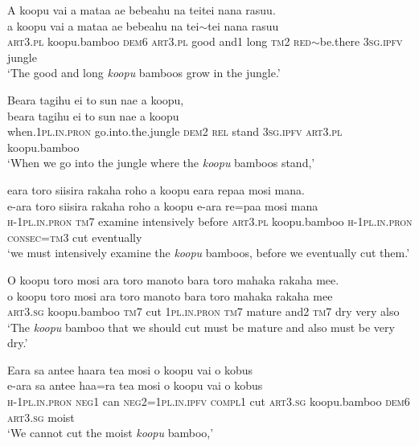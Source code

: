 \ea\label{ex:text14-6}
A koopu vai a mataa ae bebeahu na teitei nana rasuu.\\
\gll a	koopu	vai	a	mataa	ae	bebeahu	na	tei{$\sim$}tei	nana	rasuu\\
     \textsc{art}3.\textsc{pl}	koopu.bamboo	\textsc{dem}6	\textsc{art}3.\textsc{pl}	good	and1	long	\textsc{tm}2	\textsc{red}{$\sim$}be.there	3\textsc{sg}.\textsc{ipfv}	jungle\\
\glt `The good and long \textit{koopu} bamboos grow in the jungle.'
\z

\ea\label{ex:text14-7}
Beara tagihu ei to sun nae a koopu,\\
\gll beara	tagihu	ei	to	sun	nae	a	koopu\\
     when.1\textsc{pl}.\textsc{in}.\textsc{pron}	go.into.the.jungle	\textsc{dem}2	\textsc{rel}	stand	3\textsc{sg}.\textsc{ipfv}	\textsc{art}3.\textsc{pl}	koopu.bamboo\\
\glt `When we go into the jungle where the \textit{koopu} bamboos stand,'
\z

\ea\label{ex:text14-8}
eara toro siisira rakaha roho a koopu eara repaa mosi mana.\\
\gll e-ara	toro	siisira	rakaha	roho	a	koopu	e-ara	re=paa	mosi	mana\\
     \textsc{h}-1\textsc{pl}.\textsc{in}.\textsc{pron}	\textsc{tm}7	examine	intensively	before	\textsc{art}3.\textsc{pl}	koopu.bamboo	\textsc{h}-1\textsc{pl}.\textsc{in}.\textsc{pron}	\textsc{consec}=\textsc{tm}3	cut	eventually\\
\glt `we must intensively examine the \textit{koopu} bamboos, before we eventually cut them.'
\z

\ea\label{ex:text14-9}
O koopu toro mosi ara toro manoto bara toro mahaka rakaha mee.\\
\gll o	koopu	toro	mosi	ara	toro	manoto	bara	toro	mahaka	rakaha	mee\\
     \textsc{art}3.\textsc{sg}	koopu.bamboo	\textsc{tm}7	cut	1\textsc{pl}.\textsc{in}.\textsc{pron}	\textsc{tm}7	mature	and2	\textsc{tm}7	dry	very	also\\
\glt `The \textit{koopu} bamboo that we should cut must be mature and also must be very dry.'
\z

\ea\label{ex:text14-10}
Eara sa antee haara tea mosi o koopu vai o kobus\\
\gll e-ara	sa	antee	haa=ra	tea	mosi	o	koopu	vai	o	kobus\\
     \textsc{h}-1\textsc{pl}.\textsc{in}.\textsc{pron}	\textsc{neg}1	can	\textsc{neg}2=1\textsc{pl}.\textsc{in}.\textsc{ipfv}	\textsc{compl}1	cut	\textsc{art}3.\textsc{sg}	koopu.bamboo	\textsc{dem}6	\textsc{art}3.\textsc{sg}	moist\\
\glt `We cannot cut the moist \textit{koopu} bamboo,'
\z


